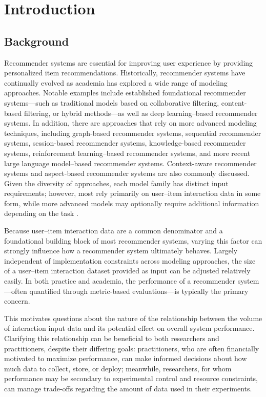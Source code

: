 \documentclass[12pt,a4paper]{article}
\begin{document}
\section{Introduction}
\subsection{Background}
Recommender systems are essential for improving user experience by providing personalized item recommendations. Historically, recommender systems have continually evolved as academia has explored a wide range of modeling approaches. Notable examples include established foundational recommender systems—such as traditional models based on collaborative filtering, content-based filtering, or hybrid methods—as well as deep learning--based recommender systems. In addition, there are approaches that rely on more advanced modeling techniques, including graph-based recommender systems, sequential recommender systems, session-based recommender systems, knowledge-based recommender systems, reinforcement learning--based recommender systems, and more recent large language model--based recommender systems. Context-aware recommender systems and aspect-based recommender systems are also commonly discussed. Given the diversity of approaches, each model family has distinct input requirements; however, most rely primarily on user--item interaction data in some form, while more advanced models may optionally require additional information depending on the task \cite{raza2025}.

Because user--item interaction data are a common denominator and a foundational building block of most recommender systems, varying this factor can strongly influence how a recommender system ultimately behaves. Largely independent of implementation constraints across modeling approaches, the size of a user--item interaction dataset provided as input can be adjusted relatively easily. In both practice and academia, the performance of a recommender system—often quantified through metric-based evaluations—is typically the primary concern.

This motivates questions about the nature of the relationship between the volume of interaction input data and its potential effect on overall system performance. Clarifying this relationship can be beneficial to both researchers and practitioners, despite their differing goals: practitioners, who are often financially motivated to maximize performance, can make informed decisions about how much data to collect, store, or deploy; meanwhile, researchers, for whom performance may be secondary to experimental control and resource constraints, can manage trade-offs regarding the amount of data used in their experiments.
\end{document}
